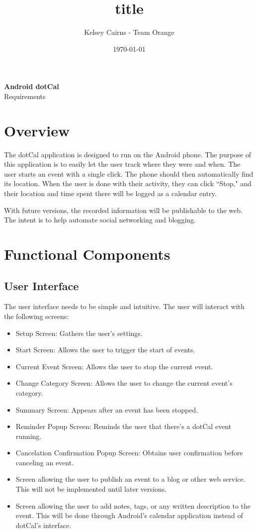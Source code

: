 \documentclass[11pt]{article}
\title{title}
\author{Kelsey Cairns - Team Orange}
\date{\today} %
\begin{document}
\begin{centering}
\textbf{\huge{Android dotCal}}\\
\LARGE{Requirements}

\end{centering}

\tableofcontents

\section{Overview}

The dotCal application is designed to run on the Android phone. The purpose of this application is to easily let the user track where they were and when. The user starts an event with a single click. The phone should then automatically find its location. When the user is done with their activity, they can click ``Stop," and their location and time spent there will be logged as a calendar entry.

With future versions, the recorded information will be publishable to the web. The intent is to help automate social networking and blogging.

\section{Functional Components}

\subsection{User Interface}

The user interface needs to be simple and intuitive. The user will interact with the following screens:

\begin{itemize}
	\item{Setup Screen: Gathers the user's settings.}
	\item{Start Screen: Allows the user to trigger the start of events.}
	\item{Current Event Screen: Allows the user to stop the current event.}
	\item{Change Category Screen: Allows the user to change the current event's category.}
	\item{Summary Screen: Appears after an event has been stopped.}
	\item{Reminder Popup Screen: Reminds the user that there's a dotCal event running.}
	\item{Cancelation Confirmation Popup Screen: Obtains user confirmation before canceling an event.}
	\item{Screen allowing the user to publish an event to a blog or other web service. This will not be implemented until later versions.}
	\item{Screen allowing the user to add notes, tags, or any written description to the event. This will be done through Android's calendar application instead of dotCal's interface.}
\end{itemize}
\end{document}
